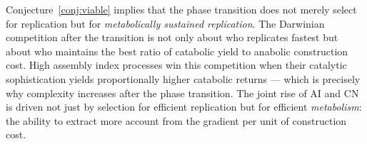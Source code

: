 \begin{remark}
Conjecture~\ref{conj:viable} implies that the phase transition
does not merely select for replication but for
\emph{metabolically sustained replication}.
The Darwinian competition after the transition is not only
about who replicates fastest but about who maintains the best
ratio of catabolic yield to anabolic construction cost.
High assembly index processes win this competition when their
catalytic sophistication yields proportionally higher catabolic
returns --- which is precisely why complexity increases after
the phase transition.
The joint rise of $\mathrm{AI}$ and $\mathrm{CN}$ is driven not
just by selection for efficient replication but for efficient
\emph{metabolism}: the ability to extract more account from the
gradient per unit of construction cost.
\end{remark}

